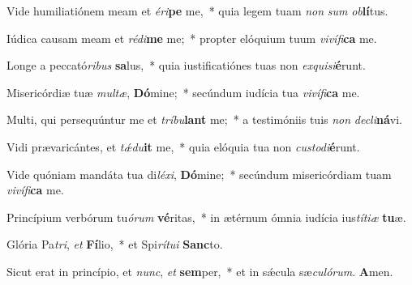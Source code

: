 \item Vide humiliatiónem meam et \textit{é}\textit{ri}\textbf{pe} me,~* quia legem tuam \textit{non} \textit{sum} \textit{ob}\textbf{lí}tus.

\item Iúdica causam meam et \textit{réd}\textit{i}\textbf{me} me;~* propter elóquium tuum \textit{vi}\textit{ví}\textit{fi}\textbf{ca} me.

\item Longe a peccató\textit{ri}\textit{bus} \textbf{sa}lus,~* quia iustificatiónes tuas non \textit{ex}\textit{qui}\textit{si}\textbf{é}runt.

\item Misericórdiæ tuæ \textit{mul}\textit{tæ}, \textbf{Dó}mine;~* secúndum iudícia tua \textit{vi}\textit{ví}\textit{fi}\textbf{ca} me.

\item Multi, qui persequúntur me et \textit{trí}\textit{bu}\textbf{lant} me;~* a testimóniis tuis \textit{non} \textit{de}\textit{cli}\textbf{ná}vi.

\item Vidi prævaricántes, et \textit{tǽ}\textit{du}\textbf{it} me,~* quia elóquia tua non \textit{cus}\textit{to}\textit{di}\textbf{é}runt.

\item Vide quóniam mandáta tua di\textit{lé}\textit{xi}, \textbf{Dó}mine;~* secúndum misericórdiam tuam \textit{vi}\textit{ví}\textit{fi}\textbf{ca} me.

\item Princípium verbórum tu\textit{ó}\textit{rum} \textbf{vé}ritas,~* in ætérnum ómnia iudícia ius\textit{tí}\textit{ti}\textit{æ} \textbf{tu}æ.

\item Glória Pa\textit{tri}, \textit{et} \textbf{Fí}lio,~* et Spi\textit{rí}\textit{tu}\textit{i} \textbf{Sanc}to.

\item Sicut erat in princípio, et \textit{nunc}, \textit{et} \textbf{sem}per,~* et in sǽcula sæ\textit{cu}\textit{ló}\textit{rum}. \textbf{A}men.